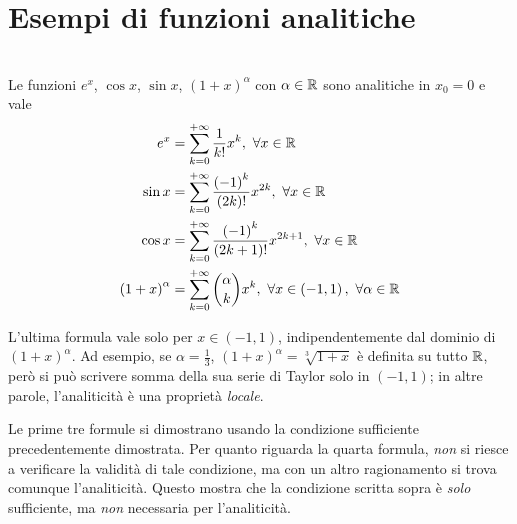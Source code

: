 \section{Esempi di funzioni analitiche}
\begin{theorema}~{}\\
	Le funzioni $e^x$, $\cos x$, $\sin x$, $\left(1+x\right)^\alpha$ con $\alpha\in\mathbb{R}$ sono analitiche in $x_0=0$ e vale
	\begin{align}
		e^x&=\sum_{k=0}^{+\infty}\frac{1}{k!}x^k,\ \forall x\in\realset\\
		\sin x&=\sum_{k=0}^{+\infty}\frac{\left(-1\right)^k}{\left(2k\right)!}x^{2k},\ \forall x\in\realset\\
		\cos x&=\sum_{k=0}^{+\infty}\frac{\left(-1\right)^k}{\left(2k+1\right)!}x^{2k+1},\ \forall x\in\realset\\
		\left(1+x\right)^\alpha&=\sum_{k=0}^{+\infty}\binom{\alpha}{k}x^k,\ \forall x\in\left(-1,1\right),\ \forall \alpha\in\realset
	\end{align}
\end{theorema}
\begin{attention}
	L'ultima formula vale solo per $x\in\left(-1,1\right)$, indipendentemente dal dominio di $\left(1+x\right)^\alpha$. Ad esempio, se $\alpha=\frac{1}{3}$, $\left(1+x\right)^\alpha=\sqrt[3]{1+x}$ è definita su tutto $\mathbb{R}$, però si può scrivere somma della sua serie di Taylor solo in $\left(-1,1\right)$; in altre parole, l'analiticità è una proprietà \textit{locale}.
\end{attention}
Le prime tre formule si dimostrano usando la condizione sufficiente precedentemente dimostrata. Per quanto riguarda la quarta formula, \textit{non} si riesce a verificare la validità di tale condizione, ma con un altro ragionamento si trova comunque l'analiticità. Questo mostra che la condizione scritta sopra è \textit{solo} sufficiente, ma \textit{non} necessaria per l'analiticità.

